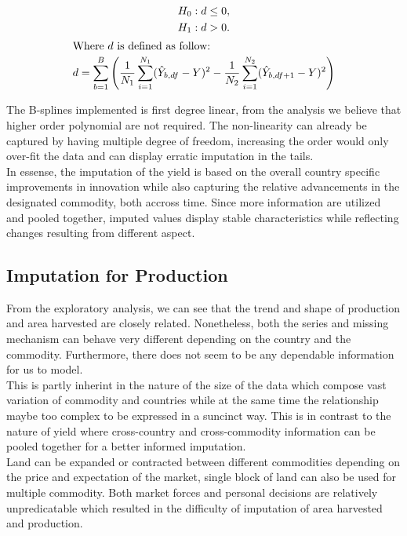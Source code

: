 \documentclass[nojss]{jss}\usepackage[]{graphicx}\usepackage[]{color}
\begin{document}
\begin{gather*}
  H_0 : d\le0 ,\\
  H_1 : d>0 .\\
  \intertext{Where $d$ is defined as follow:}
  d = \sum_{b=1}^B\left(
  \frac{1}{N_1}\sum_{i=1}^{N_1}(\hat{Y}_{b, df} - Y)^2 - 
  \frac{1}{N_2}\sum_{i=1}^{N_2}(\hat{Y}_{b, df + 1} - Y)^2\right)
\end{gather*}

The B-splines implemented is first degree linear, from the analysis we
believe that higher order polynomial are not required. The
non-linearity can already be captured by having multiple degree of
freedom, increasing the order would only over-fit the data and can
display erratic imputation in the tails.\\


In essense, the imputation of the yield is based on the overall
country specific improvements in innovation while also capturing the
relative advancements in the designated commodity, both accross
time. Since more information are utilized and pooled together, imputed
values display stable characteristics while reflecting changes
resulting from different aspect.\\



\FloatBarrier
\subsection{Imputation for Production}

From the exploratory analysis, we can see that the trend and shape of
production and area harvested are closely related. Nonetheless, both
the series and missing mechanism can behave very different depending
on the country and the commodity. Furthermore, there does not seem to
be any dependable information for us to model.\\


This is partly inherint in the nature of the size of the data which
compose vast variation of commodity and countries while at the same
time the relationship maybe too complex to be expressed in a suncinct
way. This is in contrast to the nature of yield where cross-country
and cross-commodity information can be pooled together for a better
informed imputation.\\

Land can be expanded or contracted between different commodities
depending on the price and expectation of the market, single block of
land can also be used for multiple commodity. Both market forces and
personal decisions are relatively unpredicatable which resulted in the
difficulty of imputation of area harvested and production.\\
\end{document}
